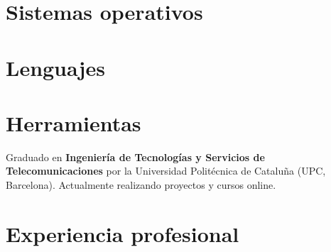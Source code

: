 \documentclass{greatcv}
\begin{document}

\begin{cvsidebar}

\cvmakeprofile

\section*{Sistemas operativos}

{
\LARGE
\color{cvsidebariconcolor}
\faWindows
\hspace{\baselineskip}
\faLinux
}

\section*{Lenguajes}


\section*{Herramientas}


\end{cvsidebar}


Graduado en \textbf{Ingeniería de Tecnologías y Servicios de Telecomunicaciones} por la Universidad Politécnica de Cataluña (UPC, Barcelona). Actualmente realizando proyectos y cursos online.

\section*{Experiencia profesional}
\end{document}
